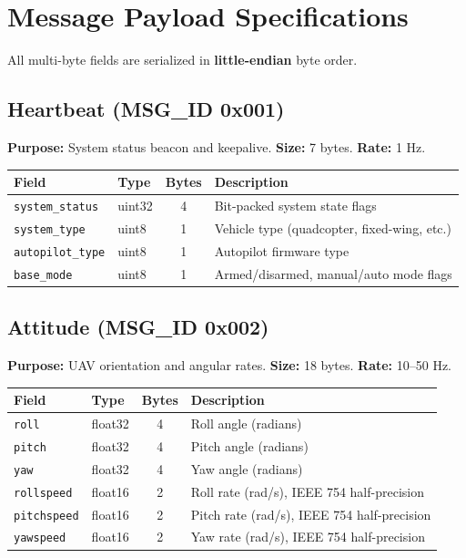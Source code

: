 \documentclass[11pt,a4paper]{article}
\begin{document}
\newpage
\section{Message Payload Specifications}
\label{sec:messages}

All multi-byte fields are serialized in \textbf{little-endian} byte order.

\subsection{Heartbeat (MSG\_ID 0x001)}

\textbf{Purpose:} System status beacon and keepalive. \textbf{Size:} 7 bytes. \textbf{Rate:} 1 Hz.

\begin{table}[H]
\centering
\begin{tabular}{@{}llcl@{}}
\toprule
\textbf{Field} & \textbf{Type} & \textbf{Bytes} & \textbf{Description} \\
\midrule
\texttt{system\_status}  & uint32 & 4 & Bit-packed system state flags \\
\texttt{system\_type}    & uint8  & 1 & Vehicle type (quadcopter, fixed-wing, etc.) \\
\texttt{autopilot\_type} & uint8  & 1 & Autopilot firmware type \\
\texttt{base\_mode}      & uint8  & 1 & Armed/disarmed, manual/auto mode flags \\
\bottomrule
\end{tabular}
\end{table}

\subsection{Attitude (MSG\_ID 0x002)}

\textbf{Purpose:} UAV orientation and angular rates. \textbf{Size:} 18 bytes. \textbf{Rate:} 10--50 Hz.

\begin{table}[H]
\centering
\begin{tabular}{@{}llcl@{}}
\toprule
\textbf{Field} & \textbf{Type} & \textbf{Bytes} & \textbf{Description} \\
\midrule
\texttt{roll}       & float32 & 4 & Roll angle (radians) \\
\texttt{pitch}      & float32 & 4 & Pitch angle (radians) \\
\texttt{yaw}        & float32 & 4 & Yaw angle (radians) \\
\texttt{rollspeed}  & float16 & 2 & Roll rate (rad/s), IEEE 754 half-precision \\
\texttt{pitchspeed} & float16 & 2 & Pitch rate (rad/s), IEEE 754 half-precision \\
\texttt{yawspeed}   & float16 & 2 & Yaw rate (rad/s), IEEE 754 half-precision \\
\bottomrule
\end{tabular}
\end{table}
\end{document}
